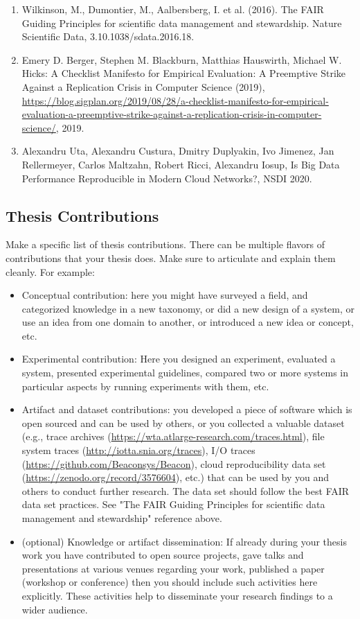 \documentclass{article}
\begin{document}
\begin{enumerate}
    \item Wilkinson, M., Dumontier, M., Aalbersberg, I. et al. (2016). The FAIR Guiding Principles for scientific data management and stewardship. Nature Scientific Data, 3.10.1038/sdata.2016.18. 
    \item Emery D. Berger, Stephen M. Blackburn, Matthias Hauswirth, Michael W. Hicks: A Checklist Manifesto for Empirical Evaluation: A Preemptive Strike Against a Replication Crisis in Computer Science (2019),  \url{https://blog.sigplan.org/2019/08/28/a-checklist-manifesto-for-empirical-evaluation-a-preemptive-strike-against-a-replication-crisis-in-computer-science/}, 2019. 
    \item Alexandru Uta, Alexandru Custura, Dmitry Duplyakin, Ivo Jimenez, Jan Rellermeyer, Carlos Maltzahn, Robert Ricci, Alexandru Iosup, Is Big Data Performance Reproducible in Modern Cloud Networks?, NSDI 2020. 
\end{enumerate}


\subsection{Thesis Contributions}
Make a specific list of thesis contributions. There can be multiple flavors of contributions that your thesis does. Make sure to articulate and explain them cleanly. For example: 
\begin{itemize}
    \item Conceptual contribution: here you might have surveyed a field, and categorized knowledge in a new taxonomy, or did a new design of a system, or use an idea from one domain to another, or introduced a new idea or concept, etc. 
    \item Experimental contribution: Here you designed an experiment, evaluated a system, presented experimental guidelines, compared two or more systems in particular aspects by running experiments with them, etc. 
    \item Artifact and dataset contributions: you developed a piece of software which is open sourced and can be used by others, or you collected a valuable dataset (e.g., trace archives (\url{https://wta.atlarge-research.com/traces.html}), file system traces (\url{http://iotta.snia.org/traces}), I/O traces (\url{https://github.com/Beaconsys/Beacon}), cloud reproducibility data set  (\url{https://zenodo.org/record/3576604}), etc.) that can be used by you and others to conduct further research. The data set should follow the best FAIR data set practices. See "The FAIR Guiding Principles for scientific data management and stewardship" reference above. 
    \item (optional) Knowledge or artifact dissemination: If already during your thesis work you have contributed to open source projects, gave talks and presentations at various venues regarding your work, published a paper (workshop or conference) then you should include such activities here explicitly. These activities help to disseminate your research findings to a wider audience.
\end{itemize}
\end{document}
